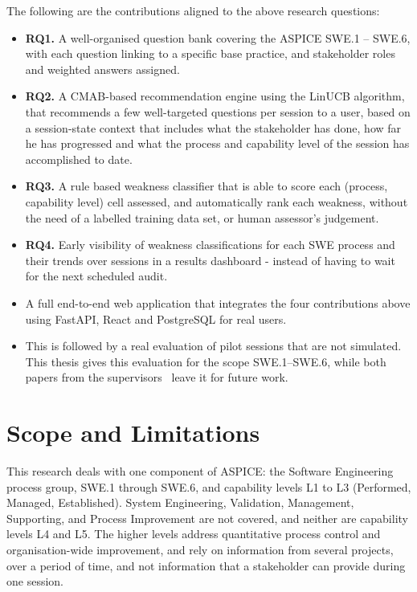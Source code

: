 \documentclass[a4paper, 12pt, oneside, openany, BCOR1cm,toc=chapterentrywithdots]{scrbook}
\begin{document}
The following are the contributions aligned to the above research questions:

\begin{itemize}
  \item \textbf{RQ1.} A well-organised question bank covering the ASPICE SWE.1 -- SWE.6, with
  each question linking to a specific base practice, and stakeholder roles and weighted answers
  assigned.
  \item \textbf{RQ2.} A CMAB-based recommendation engine using the LinUCB algorithm, that
  recommends a few well-targeted questions per session to a user, based on a session-state
  context that includes what the stakeholder has done, how far he has progressed and what the
  process and capability level of the session has accomplished to date.
  \item \textbf{RQ3.} A rule based weakness classifier that is able to score each (process,
  capability level) cell assessed, and automatically rank each weakness, without the need of a
  labelled training data set, or human assessor's judgement.
  \item \textbf{RQ4.} Early visibility of weakness classifications for each SWE process and their
  trends over sessions in a results dashboard - instead of having to wait for the next scheduled
  audit.
  \item A full end-to-end web application that integrates the four contributions above using
  FastAPI, React and PostgreSQL for real users.
  \item This is followed by a real evaluation of pilot sessions that are not simulated. This
  thesis gives this evaluation for the scope SWE.1--SWE.6, while both papers from the
  supervisors~\cite{datsogiannis2024early,datsogiannis2025recommender} leave it for future work.
\end{itemize}

\section{Scope and Limitations}

This research deals with one component of ASPICE: the Software Engineering process group,
SWE.1 through SWE.6, and capability levels L1 to L3 (Performed, Managed, Established).
System Engineering, Validation, Management, Supporting, and Process
Improvement are not covered, and neither are capability levels L4 and L5. The higher levels address quantitative process control and organisation-wide
improvement, and rely on information from several projects, over a period of time, and not
information that a stakeholder can provide during one session.
\end{document}

